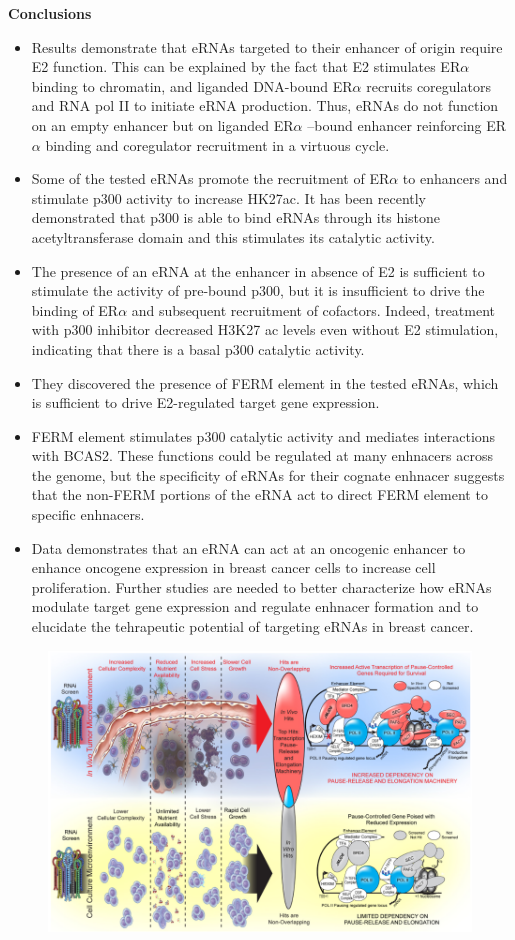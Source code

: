 \textbf{Conclusions}
\begin{itemize}
\item Results demonstrate that eRNAs targeted to their enhancer of origin require E2 function. This can be
explained by the fact that E2 stimulates ER$\alpha$ binding to chromatin, and liganded DNA-bound ER$\alpha$
recruits coregulators and RNA pol II to initiate eRNA production. Thus, eRNAs do not function on an
empty enhancer but on liganded ER$\alpha$ –bound enhancer reinforcing ER$\alpha$ binding and coregulator
recruitment in a virtuous cycle.
\item Some of the tested eRNAs promote the recruitment of ER$\alpha$ to enhancers and stimulate p300 activity
to increase HK27ac. It has been recently demonstrated that p300 is able to bind eRNAs through its
histone acetyltransferase domain and this stimulates its catalytic activity.
\item The presence of an eRNA at the enhancer in absence of E2 is sufficient to stimulate the activity of
pre-bound p300, but it is insufficient to drive the binding of ER$\alpha$ and subsequent recruitment of
cofactors. Indeed, treatment with p300 inhibitor decreased H3K27 ac levels even without E2
stimulation, indicating that there is a basal p300 catalytic activity.
\item They discovered the presence of FERM element in the tested eRNAs, which is sufficient to drive
E2-regulated target gene expression.
\item FERM element stimulates p300 catalytic activity and mediates interactions with BCAS2. These
functions could be regulated at many enhnacers across the genome, but the specificity of eRNAs
for their cognate enhnacer suggests that the non-FERM portions of the eRNA act to direct FERM
element to specific enhnacers.
\item Data demonstrates that an eRNA can act at an oncogenic enhancer to enhance oncogene
expression in breast cancer cells to increase cell proliferation. Further studies are needed to
better characterize how eRNAs modulate target gene expression and regulate enhnacer
formation and to elucidate the tehrapeutic potential of targeting eRNAs in breast cancer.
\end{itemize}


\begin{figure}
\centering
\includegraphics[width=\textwidth]{../_resources/RNAi.png}
\caption{}
\end{figure}







 


